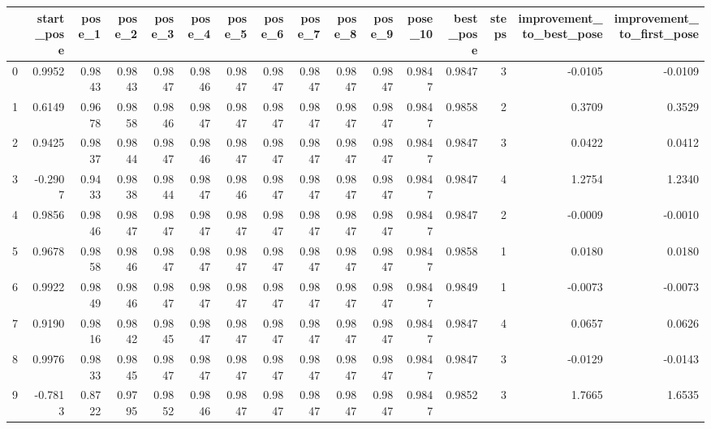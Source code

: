 \begin{tabular}{lrrrrrrrrrrrrrrr}
\toprule
{} &  start\_pose &  pose\_1 &  pose\_2 &  pose\_3 &  pose\_4 &  pose\_5 &  pose\_6 &  pose\_7 &  pose\_8 &  pose\_9 &  pose\_10 &  best\_pose &  steps &  improvement\_to\_best\_pose &  improvement\_to\_first\_pose \\
\midrule
0  &      0.9952 &  0.9843 &  0.9843 &  0.9847 &  0.9846 &  0.9847 &  0.9847 &  0.9847 &  0.9847 &  0.9847 &   0.9847 &     0.9847 &      3 &                   -0.0105 &                    -0.0109 \\
1  &      0.6149 &  0.9678 &  0.9858 &  0.9846 &  0.9847 &  0.9847 &  0.9847 &  0.9847 &  0.9847 &  0.9847 &   0.9847 &     0.9858 &      2 &                    0.3709 &                     0.3529 \\
2  &      0.9425 &  0.9837 &  0.9844 &  0.9847 &  0.9846 &  0.9847 &  0.9847 &  0.9847 &  0.9847 &  0.9847 &   0.9847 &     0.9847 &      3 &                    0.0422 &                     0.0412 \\
3  &     -0.2907 &  0.9433 &  0.9838 &  0.9844 &  0.9847 &  0.9846 &  0.9847 &  0.9847 &  0.9847 &  0.9847 &   0.9847 &     0.9847 &      4 &                    1.2754 &                     1.2340 \\
4  &      0.9856 &  0.9846 &  0.9847 &  0.9847 &  0.9847 &  0.9847 &  0.9847 &  0.9847 &  0.9847 &  0.9847 &   0.9847 &     0.9847 &      2 &                   -0.0009 &                    -0.0010 \\
5  &      0.9678 &  0.9858 &  0.9846 &  0.9847 &  0.9847 &  0.9847 &  0.9847 &  0.9847 &  0.9847 &  0.9847 &   0.9847 &     0.9858 &      1 &                    0.0180 &                     0.0180 \\
6  &      0.9922 &  0.9849 &  0.9846 &  0.9847 &  0.9847 &  0.9847 &  0.9847 &  0.9847 &  0.9847 &  0.9847 &   0.9847 &     0.9849 &      1 &                   -0.0073 &                    -0.0073 \\
7  &      0.9190 &  0.9816 &  0.9842 &  0.9845 &  0.9847 &  0.9847 &  0.9847 &  0.9847 &  0.9847 &  0.9847 &   0.9847 &     0.9847 &      4 &                    0.0657 &                     0.0626 \\
8  &      0.9976 &  0.9833 &  0.9845 &  0.9847 &  0.9847 &  0.9847 &  0.9847 &  0.9847 &  0.9847 &  0.9847 &   0.9847 &     0.9847 &      3 &                   -0.0129 &                    -0.0143 \\
9  &     -0.7813 &  0.8722 &  0.9795 &  0.9852 &  0.9846 &  0.9847 &  0.9847 &  0.9847 &  0.9847 &  0.9847 &   0.9847 &     0.9852 &      3 &                    1.7665 &                     1.6535 \\

\end{tabular}
